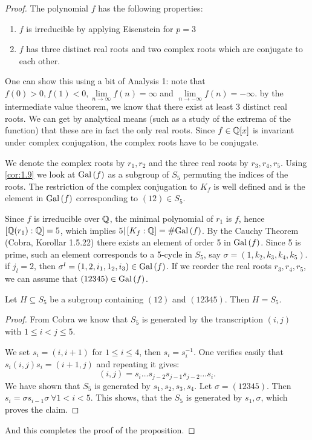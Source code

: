\documentclass[twoside = false,	%
		headsepline,		%
		parskip = true,
		]{scrbook}						%
\begin{document}
        \begin{proof}
            The polynomial $f$ has the following properties:
            \begin{enumerate}
                \item $f$ is irreducible by applying Eisenstein for $p=3$
                \item $f$ has three distinct real roots and two complex roots which are conjugate to each other.
            \end{enumerate}
            One can show this using a bit of Analysis 1: note that $f(0)>0, f(1)<0, \lim\limits_{n\to\infty}f(n)=\infty$ and $\lim\limits_{n\to-\infty}f(n) = -\infty$.
            by the intermediate value theorem, we know that there exist at least 3 distinct real roots.
            We can get by analytical means (such as a study of the extrema of the function) that these are in fact the only real roots. Since $f\in\mathbb Q[x]$ is invariant under complex conjugation, the complex roots have to be conjugate.
            
            We denote the complex roots by $r_1, r_2$ and the three real roots by $r_3, r_4, r_5$. Using \ref{cor:1.9} we look at $\mathrm{Gal}\left( f\right)$ as a subgroup of $S_5$ permuting the indices of the roots. The restriction of the complex conjugation to $K_f$ is well defined and is the element in $\mathrm{Gal}\left( f\right)$ corresponding to $(12)\in S_5$.
            
            Since $f$ is irreducible over $\mathbb Q$, the minimal polynomial of $r_1$ is $f$, hence $\left[ \mathbb Q(r_1):\mathbb Q\right]=5$, which implies $5| \left[ K_f:\mathbb Q\right] = \#\mathrm{Gal}\left( f\right)$. By the Cauchy Theorem (Cobra, Korollar 1.5.22) there exists an element of order 5 in $\mathrm{Gal}\left( f\right)$. Since 5 is prime, such an element corresponds to a 5-cycle in $S_5$, say $\sigma=(1,k_2,k_3,k_4,k_5)$. if $j_l=2$, then $\sigma^l=(1,2,i_1,1_2,i_3)\in\mathrm{Gal}\left( f\right)$. If we reorder the real roots $r_3, r_4, r_5$, we can assume that $(12345)\in\mathrm{Gal}\left( f\right)$.
            
            \begin{claim*}{}
                Let $H\subseteq S_5$ be a subgroup containing $(12)$ and $(12345)$. Then $H=S_5$.
            \end{claim*}
            \begin{proof}
                From Cobra we know that $S_5$ is generated by the transcription $(i,j)$ with $1\leq i < j \leq 5$.
                
                We set $s_i=(i,i+1)$ for $1\leq i \leq 4$, then $s_i=s_i^{-1}$. {\color{blue} One verifies easily that $s_i(i,j)s_i=(i+1,j)$} and repeating it gives:
                $$(i,j)=s_i\dots s_{j-2}s_{j-1}s_{j-2}\dots s_i.$$
                We have shown that $S_5$ is generated by $s_1,s_2,s_3,s_4$. Let $\sigma=(12345)$. Then $s_i=\sigma s_{i-1} \sigma \ \forall 1<i<5$. This shows, that the $S_5$ is generated by $s_1,\sigma$, which proves the claim.
            \end{proof}
            And this completes the proof of the proposition.
        \end{proof}
\end{document}
